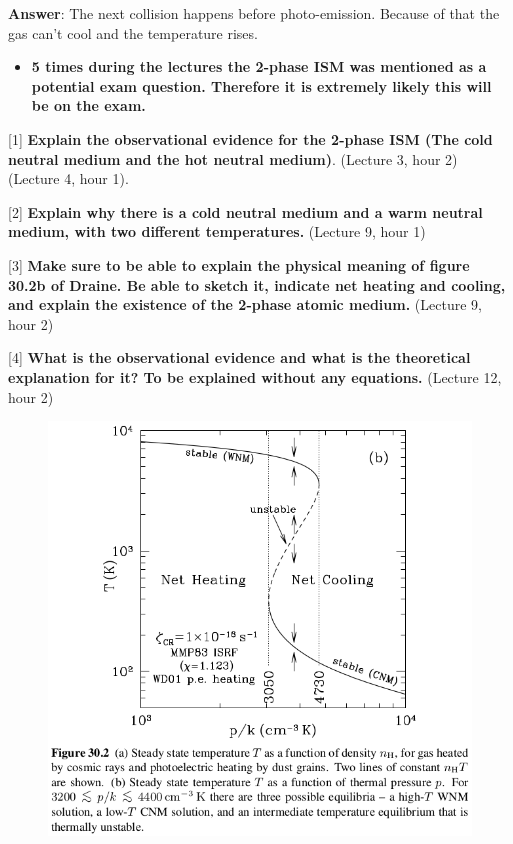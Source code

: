 \documentclass[11pt]{article}
\makeatletter
\def\maxwidth{\ifdim\Gin@nat@width>\linewidth\linewidth
    \else\Gin@nat@width\fi}
\let\Oldincludegraphics\includegraphics
\renewcommand{\includegraphics}[1]{\Oldincludegraphics[width=.8\maxwidth]{#1}}
\providecommand{\tightlist}{%
      \setlength{\itemsep}{0pt}\setlength{\parskip}{0pt}}
\makeatother
\begin{document}
\textbf{Answer}: The next collision happens before photo-emission.
Because of that the gas can't cool and the temperature rises.

    \begin{itemize}
\tightlist
\item
  \textbf{5 times during the lectures the 2-phase ISM was mentioned as a
  potential exam question. Therefore it is extremely likely this will be
  on the exam.}
\end{itemize}

{[}1{]} \textbf{Explain the observational evidence for the 2-phase ISM
(The cold neutral medium and the hot neutral medium)}. (Lecture 3, hour
2) (Lecture 4, hour 1).

{[}2{]} \textbf{Explain why there is a cold neutral medium and a warm
neutral medium, with two different temperatures.} (Lecture 9, hour 1)

{[}3{]} \textbf{Make sure to be able to explain the physical meaning of
figure 30.2b of Draine. Be able to sketch it, indicate net heating and
cooling, and explain the existence of the 2-phase atomic medium.}
(Lecture 9, hour 2)

{[}4{]} \textbf{What is the observational evidence and what is the
theoretical explanation for it? To be explained without any equations.}
(Lecture 12, hour 2)

\begin{figure}
\centering
\includegraphics{figs/fig_5.png}
\caption{}
\end{figure}
\end{document}
